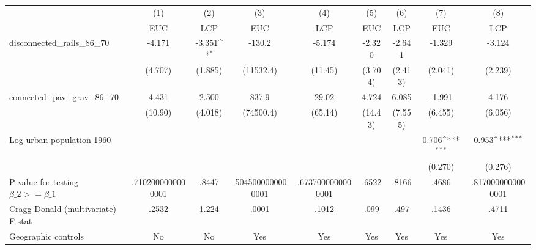 {
\def\sym#1{\ifmmode^{#1}\else\(^{#1}\)\fi}
\begin{tabular}{l*{8}{c}}
\hline\hline
                &\multicolumn{1}{c}{(1)}&\multicolumn{1}{c}{(2)}&\multicolumn{1}{c}{(3)}&\multicolumn{1}{c}{(4)}&\multicolumn{1}{c}{(5)}&\multicolumn{1}{c}{(6)}&\multicolumn{1}{c}{(7)}&\multicolumn{1}{c}{(8)}\\
                &\multicolumn{1}{c}{EUC}&\multicolumn{1}{c}{LCP}&\multicolumn{1}{c}{EUC}&\multicolumn{1}{c}{LCP}&\multicolumn{1}{c}{EUC}&\multicolumn{1}{c}{LCP}&\multicolumn{1}{c}{EUC}&\multicolumn{1}{c}{LCP}\\
\hline
disconnected\_rails\_86\_70&   -4.171         &   -3.351\sym{*}  &   -130.2         &   -5.174         &   -2.320         &   -2.641         &   -1.329         &   -3.124         \\
                &  (4.707)         &  (1.885)         &(11532.4)         &  (11.45)         &  (3.704)         &  (2.413)         &  (2.041)         &  (2.239)         \\
[1em]
connected\_pav\_grav\_86\_70&    4.431         &    2.500         &    837.9         &    29.02         &    4.724         &    6.085         &   -1.991         &    4.176         \\
                &  (10.90)         &  (4.018)         &(74500.4)         &  (65.14)         &  (14.43)         &  (7.555)         &  (6.455)         &  (6.056)         \\
[1em]
Log urban population 1960&                  &                  &                  &                  &                  &                  &    0.706\sym{***}&    0.953\sym{***}\\
                &                  &                  &                  &                  &                  &                  &  (0.270)         &  (0.276)         \\
\hline
P-value for testing $\beta\_{2} >= \beta\_{1}$&.7102000000000001         &    .8447         &.5045000000000001         &.6737000000000001         &    .6522         &    .8166         &    .4686         &.8170000000000001         \\
Cragg-Donald (multivariate) F-stat&    .2532         &    1.224         &    .0001         &    .1012         &     .099         &     .497         &    .1436         &    .4711         \\
Geographic controls&       No         &       No         &      Yes         &      Yes         &      Yes         &      Yes         &      Yes         &      Yes         \\

\end{tabular}}
